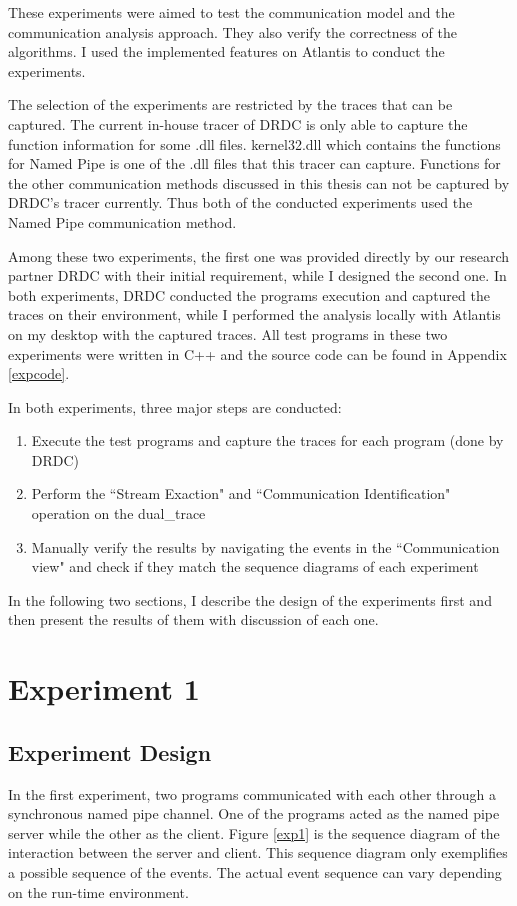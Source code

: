 \documentclass[12pt,oneside]{book}
\begin{document}
These experiments were aimed to test the communication model and the communication analysis approach. They also verify the correctness of the algorithms. I used the implemented features on Atlantis to conduct the experiments.

The selection of the experiments are restricted by the traces that can be captured. The current in-house tracer of DRDC is only able to capture the function information for some .dll files. kernel32.dll which contains the functions for Named Pipe is one of the .dll files that this tracer can capture. Functions for the other communication methods discussed in this thesis can not be captured by DRDC's tracer currently.  Thus both of the conducted experiments used the Named Pipe communication method. 

Among these two experiments, the first one was provided directly by our research partner DRDC with their initial requirement, while I designed the second one. In both experiments, DRDC conducted the programs execution and captured the traces on their environment, while I performed the analysis locally with Atlantis on my desktop with the captured traces. All test programs in these two experiments were written in C++ and the source code can be found in Appendix \ref{expcode}. 

In both experiments, three major steps are conducted:
\begin{enumerate}
\item Execute the test programs and capture the traces for each program (done by DRDC)

\item Perform the ``Stream Exaction" and ``Communication Identification" operation on the dual\_trace

\item Manually verify the results by navigating the events in the ``Communication view" and check if they match the sequence diagrams of each experiment
\end{enumerate}

In the following two sections, I describe the design of the experiments first and then present the results of them with discussion of each one.

\section{Experiment 1}
\subsection{Experiment Design}
In the first experiment, two programs communicated with each other through a synchronous named pipe channel. One of the programs acted as the named pipe server while the other as the client. Figure \ref{exp1} is the sequence diagram of the interaction between the server and client. This sequence diagram only exemplifies a possible sequence of the events. The actual event sequence can vary depending on the run-time environment. 
\end{document}
